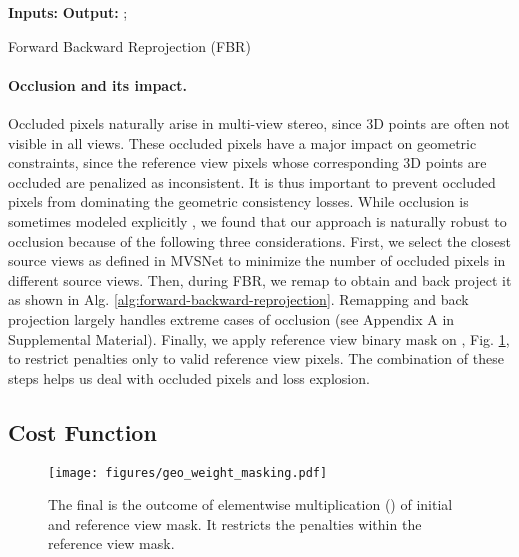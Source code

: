 \documentclass[10pt,twocolumn,letterpaper]{article}
\begin{document}
\begin{algorithm}[t]
\footnotesize
\begin{algorithmic}
    \State \textbf{Inputs:} 
    \State \textbf{Output:} 
    \State ;  
    \State  {}
    \State  
    \State   {}
    \State          {}
    \State 
\end{algorithmic}
\caption{Forward Backward Reprojection (FBR)}
\label{alg:forward-backward-reprojection}
\end{algorithm}

\vspace{-10pt}
\paragraph{Occlusion and its impact.}
Occluded pixels naturally arise in multi-view stereo, since 3D points
are often not visible in all views. These occluded pixels have a
major impact on geometric constraints, since the 
reference view pixels whose corresponding 3D points
are occluded are penalized as inconsistent.
It is thus important to prevent occluded pixels from dominating the
geometric consistency losses.  While occlusion is sometimes modeled
explicitly \cite{kang2001occlusion, nakamura1996stereoocclusion}, we
found that our approach is naturally robust to occlusion because of 
the following three considerations. First, we select the closest  source views as defined in
MVSNet \cite{yao2018mvsnet} to minimize the number of occluded pixels
in different source views. Then, during FBR, we remap  to 
obtain  and back project it as shown in Alg. \ref{alg:forward-backward-reprojection}. Remapping and back
projection largely handles extreme cases of occlusion (see Appendix A
in Supplemental Material). Finally, we apply
reference view binary mask on ,
Fig. \ref{fig:geo-weight-masking}, to restrict penalties only to valid
reference view pixels. The combination of these steps helps us deal
with occluded pixels and loss explosion.







\vspace{-5pt}
\subsection{Cost Function}\label{sec:cost-function}

\begin{figure}[t]
\begin{center}
    \vspace{-7pt}
   \texttt{[image: figures/geo\_weight\_masking.pdf]}
    \vspace{-10pt}
    \caption{The final  is the outcome of elementwise multiplication () of initial  and reference view mask. It restricts the penalties within the reference view mask.}
    \label{fig:geo-weight-masking}
\end{center}
\vspace{-25pt}
\end{figure}
\end{document}
